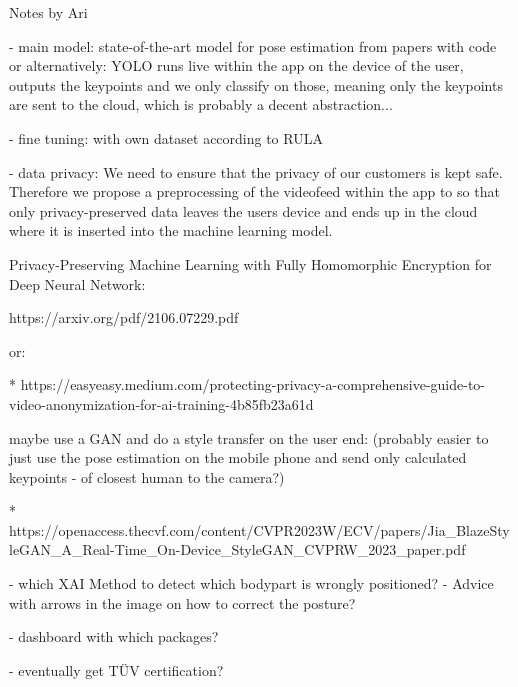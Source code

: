 
Notes by Ari

- main model:
state-of-the-art model for pose estimation from papers with code
or alternatively:
YOLO runs live within the app on the device of the user, outputs the keypoints and we only classify on those, meaning only the keypoints are sent to the cloud, which is probably a decent abstraction...

- fine tuning:
with own dataset according to RULA

- data privacy:
We need to ensure that the privacy of our customers is kept safe. Therefore we propose a preprocessing of the videofeed within the app to so that only privacy-preserved data leaves the users device and ends up in the cloud where it is inserted into the machine learning model.

Privacy-Preserving Machine Learning with Fully Homomorphic Encryption for Deep Neural Network:

https://arxiv.org/pdf/2106.07229.pdf

or:

* https://easyeasy.medium.com/protecting-privacy-a-comprehensive-guide-to-video-anonymization-for-ai-training-4b85fb23a61d

maybe use a GAN and do a style transfer on the user end: (probably easier to just use the pose estimation on the mobile phone and send only calculated keypoints - of closest human to the camera?)

* https://openaccess.thecvf.com/content/CVPR2023W/ECV/papers/Jia_BlazeStyleGAN_A_Real-Time_On-Device_StyleGAN_CVPRW_2023_paper.pdf

- which XAI Method to detect which bodypart is wrongly positioned?
- Advice with arrows in the image on how to correct the posture?

- dashboard with which packages?

- eventually get TÜV certification?
